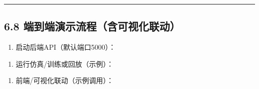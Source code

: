 \begin{center}\rule{0.5\linewidth}{0.5pt}\end{center}

\subsection{6.8
端到端演示流程（含可视化联动）}\label{ux7aefux5230ux7aefux6f14ux793aux6d41ux7a0bux542bux53efux89c6ux5316ux8054ux52a8}

\begin{enumerate}
\def\labelenumi{\arabic{enumi})}
\tightlist
\item
  启动后端API（默认端口5000）：
\end{enumerate}

\begin{Shaded}
\begin{Highlighting}[]
\end{Highlighting}
\end{Shaded}

\begin{enumerate}
\def\labelenumi{\arabic{enumi})}
\setcounter{enumi}{1}
\tightlist
\item
  运行仿真/训练或回放（示例）：
\end{enumerate}

\begin{Shaded}
\begin{Highlighting}[]
\end{Highlighting}
\end{Shaded}

\begin{enumerate}
\def\labelenumi{\arabic{enumi})}
\setcounter{enumi}{2}
\tightlist
\item
  前端/可视化联动（示例调用）：
\end{enumerate}

\begin{Shaded}
\begin{Highlighting}[]
 
  \DataTypeTok{\textbackslash{}}
       \DataTypeTok{\textbackslash{}}
      
\end{Highlighting}
\end{Shaded}

